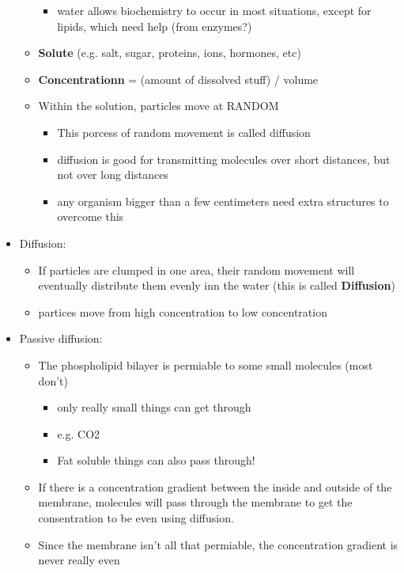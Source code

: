 \documentclass{article}
\theoremstyle{definition}
\begin{document}
\begin{itemize}
\begin{itemize}
\begin{itemize}
					\item water allows biochemistry to occur in most situations, except for lipids, which need help (from enzymes?)
				\end{itemize}
			\item \textbf{Solute} (e.g. salt, sugar, proteins, ions, hormones, etc)
			\item \textbf{Concentrationn} = (amount of dissolved stuff) / volume
			\item Within the solution, particles move at RANDOM
				\begin{itemize}
					\item This porcess of random movement is called diffusion
					\item diffusion is good for transmitting molecules over short distances, but not over long distances
					\item any organism bigger than a few centimeters need extra structures to overcome this
				\end{itemize}
		\end{itemize}
	\item Diffusion:
		\begin{itemize}
			\item If particles are clumped in one area, their random movement will eventually distribute them evenly inn the water (this is called \textbf{Diffusion})
			\item partices move from high concentration to low concentration
		\end{itemize}
	\item Passive diffusion:
		\begin{itemize}
			\item The phospholipid bilayer is permiable to some small molecules (most don't)
				\begin{itemize}
					\item only really small things can get through
					\item e.g. CO2
					\item Fat soluble things can also pass through!
				\end{itemize}
			\item If there is a concentration gradient between the inside and outside of the membrane, molecules will pass through the membrane to get the consentration to be even using diffusion.
			\item Since the membrane isn't all that permiable, the concentration gradient is never really even
		\end{itemize}
\end{itemize}
\end{document}
